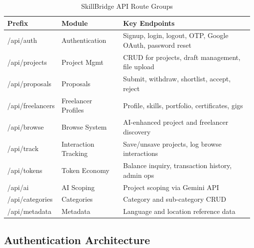 \begin{table}[h]
\centering
\caption{SkillBridge API Route Groups}
\label{tab:api_routes}
\renewcommand{\arraystretch}{1.4}
\begin{tabularx}{\textwidth}{|>{\ttfamily\footnotesize}p{3cm}|p{3cm}|X|}
\hline
\rowcolor{sblight}
\textbf{Prefix} & \textbf{Module} & \textbf{Key Endpoints} \\ \hline
/api/auth        & Authentication      & Signup, login, logout, OTP, Google OAuth, password reset \\ \hline
/api/projects    & Project Mgmt        & CRUD for projects, draft management, file upload \\ \hline
/api/proposals   & Proposals           & Submit, withdraw, shortlist, accept, reject \\ \hline
/api/freelancers & Freelancer Profiles & Profile, skills, portfolio, certificates, gigs \\ \hline
/api/browse      & Browse System       & AI-enhanced project and freelancer discovery \\ \hline
/api/track       & Interaction Tracking & Save/unsave projects, log browse interactions \\ \hline
/api/tokens      & Token Economy       & Balance inquiry, transaction history, admin ops \\ \hline
/api/ai          & AI Scoping          & Project scoping via Gemini API \\ \hline
/api/categories  & Categories          & Category and sub-category CRUD \\ \hline
/api/metadata    & Metadata            & Language and location reference data \\ \hline
\end{tabularx}
\end{table}

\subsection{Authentication Architecture}

